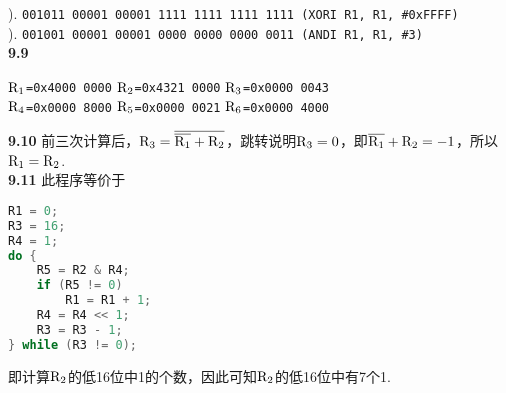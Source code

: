 \documentclass[UTF8]{ctexart}
\begin{document}
). \texttt{001011 00001 00001 1111 1111 1111 1111 (XORI R1, R1, \#0xFFFF)}\\
). \texttt{001001 00001 00001 0000 0000 0000 0011 (ANDI R1, R1, \#3)}\\
\noindent\textbf{9.9}
\begin{center}
    \texttt{$\rm R_1$=0x4000 0000}\quad\quad
    \texttt{$\rm R_2$=0x4321 0000}\quad\quad
    \texttt{$\rm R_3$=0x0000 0043}\\
    \texttt{$\rm R_4$=0x0000 8000}\quad\quad
    \texttt{$\rm R_5$=0x0000 0021}\quad\quad
    \texttt{$\rm R_6$=0x0000 4000}\\
\end{center}
\noindent\textbf{9.10} 前三次计算后，$\rm R_{3}=\overline{\overline{R_{1}}+R_{2}}$，跳转说明$\rm R_{3}=0$，即$\rm \overline{R_{1}}+R_{2}=-1$，所以$\rm R_{1}=R_{2}$.\\
\noindent\textbf{9.11} 此程序等价于
\linespread{1}
\begin{lstlisting}[language=C]
R1 = 0;
R3 = 16;
R4 = 1;
do {
    R5 = R2 & R4;
    if (R5 != 0)
        R1 = R1 + 1;
    R4 = R4 << 1;
    R3 = R3 - 1;
} while (R3 != 0);
    \end{lstlisting}
\linespread{1.5}
即计算$\rm R_2$的低16位中1的个数，因此可知$\rm R_2$的低16位中有7个1.
\end{document}
